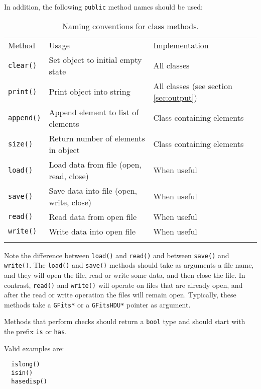 \documentclass{article}[12pt,a4]
\begin{document}
In addition, the following {\tt public} method names should be used:

\begin{table}[!h]
\caption{Naming conventions for class methods.
\label{tab:naming}}
\begin{center}
\begin{tabular}{lll}
\hline
\hline
\noalign{\smallskip}
Method & Usage & Implementation \\
\noalign{\smallskip}
\hline
\noalign{\smallskip}
{\tt clear()} & Set object to initial empty state & All classes \\
{\tt print()} & Print object into string & All classes (see section \ref{sec:output}) \\
{\tt append()} & Append element to list of elements & Class containing elements \\
{\tt size()} & Return number of elements in object & Class containing elements \\
{\tt load()} & Load data from file (open, read, close) & When useful \\
{\tt save()} & Save data into file (open, write, close) & When useful \\
{\tt read()} & Read data from open file & When useful \\
{\tt write()} & Write data into open file & When useful \\
\noalign{\smallskip}
\hline
\end{tabular}
\end{center}
\end{table}

Note the difference between {\tt load()} and {\tt read()} and between {\tt save()} and {\tt write()}.
The {\tt load()} and {\tt save()} methods should take as arguments a file name, and they
will open the file, read or write some data, and then close the file.
In contrast, {\tt read()} and {\tt write()} will operate on files that are already open, and after
the read or write operation the files will remain open.
Typically, these methods take a {\tt GFits*} or a {\tt GFitsHDU*} pointer as argument.

Methods that perform checks should return a {\tt bool} type and should start with the
prefix {\tt is} or {\tt has}.

Valid examples are:
\begin{verbatim}
  islong()
  isin()
  hasedisp()
\end{verbatim}
\end{document}
